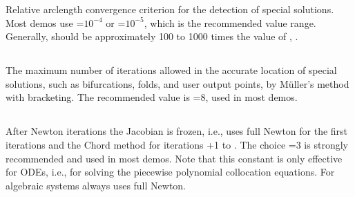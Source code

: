  Relative arclength convergence criterion for the detection of special solutions. 
 Most demos use =$10^{-4}$ or  =$10^{-5}$,
 which is the recommended value range.
 Generally,  should be approximately 100 to 1000 times the value
 of , .
 
\subsection{}  \label{sec:ITMX}


 The maximum number of iterations allowed in the accurate
 location of special solutions, such as bifurcations, folds, 
 and user output points, by M\"uller's method with bracketing.
 The recommended value is =8, used in most demos.

\subsection{}  \label{sec:NWTN}


 After  Newton iterations the Jacobian is frozen, i.e.,
 \AUTO uses full Newton for the first  iterations
 and the Chord method for iterations +1 to .
 The choice =3 is strongly recommended and used in most demos.
 Note that this constant is only effective for ODEs, i.e., for solving
 the piecewise polynomial collocation equations.
 For algebraic systems \AUTO always uses full Newton.

